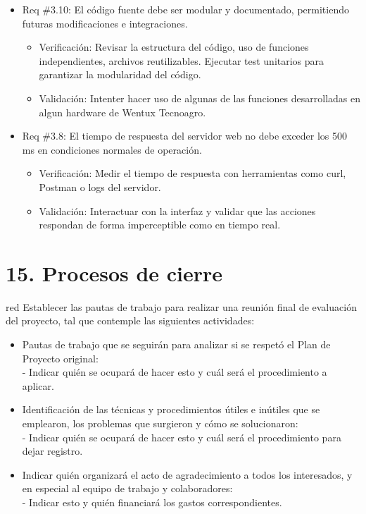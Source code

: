 \documentclass[
11pt, %
]{charter}
\begin{document}
\begin{itemize}
\item Req \#3.10: El código fuente debe ser modular y documentado, permitiendo futuras modificaciones e integraciones.
\begin{itemize}
	\item Verificación: Revisar la estructura del código, uso de funciones independientes, archivos reutilizables. Ejecutar test unitarios para garantizar la modularidad del código.
	\item Validación: Intenter hacer uso de algunas de las funciones desarrolladas en algun hardware de Wentux Tecnoagro. 
\end{itemize}


\item Req \#3.8: El tiempo de respuesta del servidor web no debe exceder los 500 ms en condiciones normales de operación.
\begin{itemize}
	\item Verificación: Medir el tiempo de respuesta con herramientas como curl, Postman o logs del servidor.
	\item Validación: Interactuar con la interfaz y validar que las acciones respondan de forma imperceptible como en tiempo real.
\end{itemize}

\end{itemize}


\section{15. Procesos de cierre}    
\label{sec:cierre}

\begin{consigna}{red}
Establecer las pautas de trabajo para realizar una reunión final de evaluación del proyecto, tal que contemple las siguientes actividades:

\begin{itemize}
	\item Pautas de trabajo que se seguirán para analizar si se respetó el Plan de Proyecto original:\\
	 - Indicar quién se ocupará de hacer esto y cuál será el procedimiento a aplicar. 
	\item Identificación de las técnicas y procedimientos útiles e inútiles que se emplearon, los problemas que surgieron y cómo se solucionaron:\\
	 - Indicar quién se ocupará de hacer esto y cuál será el procedimiento para dejar registro.
	\item Indicar quién organizará el acto de agradecimiento a todos los interesados, y en especial al equipo de trabajo y colaboradores:\\
	  - Indicar esto y quién financiará los gastos correspondientes.
\end{itemize}

\end{consigna}
\end{document}
